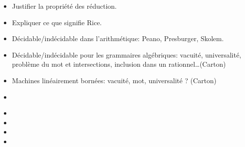\documentclass{agregfiche}
\begin{document}
\secquestionsclassiques
\begin{itemize}
\item Justifier la propriété des réduction.
\item Expliquer ce que signifie Rice.
\item Décidable/indécidable dans l'arithmétique: Peano, Presburger, Skolem.
\item Décidable/indécidable pour les grammaires algébriques: vacuité, universalité, problème du mot et intersections, inclusion dans un rationnel\dots (Carton)
\item Machines linéairement bornées: vacuité, mot, universalité ? (Carton)
\end{itemize}

\secreferences
\begin{itemize}
\item 
\end{itemize}

\secdev
\begin{itemize}
\item 
\item 
\item 
\item 

\end{itemize}
\end{document}
